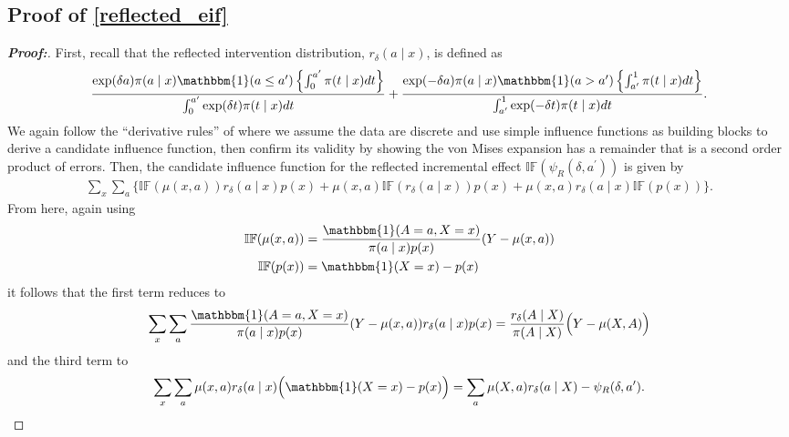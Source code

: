 \documentclass[11pt,twoside]{article}
\theoremstyle{definition}
\theoremstyle{remark}
\begin{document}
\subsection{Proof of \cref{reflected_eif}} \label{reflected_eif_proof} 

\begin{proof}[\textbf{Proof:}] First, recall that the reflected intervention distribution, $r_\delta(a \mid x)$, is defined as
    \begin{align*}
     \frac{\text{exp}(\delta a) \pi(a \mid x) \mathbbm{1}(a \leq a^\prime)\left\{ \int^{a^\prime}_0 \pi(t \mid x) dt \right\} }{\int^{a^\prime}_0 \text{exp}(\delta t) \pi(t \mid x) dt} +  \frac{\text{exp}(-\delta a) \pi(a \mid x) \mathbbm{1}(a > a^\prime) \left\{ \int^{1}_{a^\prime} \pi(t \mid x) dt \right\}}{\int^{1}_{a^\prime} \text{exp}(-\delta t) \pi(t \mid x) dt}.
\end{align*}
We again follow the ``derivative rules'' of \cite{kennedy2023semiparametric} where we assume the data are discrete and use simple influence functions as building blocks to derive a candidate influence function, then confirm its validity by showing the von Mises expansion has a remainder that is a second order product of errors. Then, the candidate influence function for the reflected incremental effect $\mathbb{IF}(\psi_R(\delta, a^\prime))$ is given by
\begin{align*}
     \sum_x \sum_a \Big\{\mathbb{IF}( \mu(x, a) ) r_\delta(a \mid x)  p(x) + \mu(x, a) \mathbb{IF}( r_\delta(a \mid x))  p(x) +  \mu(x, a) r_\delta(a \mid x) \mathbb{IF}( p(x)) \Big\}.
\end{align*}
From here, again using
\begin{align*}
    \mathbb{IF}(\mu(x, a)) &= \frac{\mathbbm{1}(A = a, X = x)}{\pi(a \mid x) p(x)}(Y - \mu(x, a)) \\
    \mathbb{IF}(p(x)) &= \mathbbm{1}(X = x) - p(x)
\end{align*}
it follows that the first term reduces to
\begin{align*}
     \sum_x \sum_a \frac{\mathbbm{1}(A = a, X = x)}{\pi(a \mid x) p(x)}(Y - \mu(x, a)) r_\delta(a \mid x)  p(x) = \frac{r_\delta(A \mid X)}{\pi(A \mid X)} \Big(Y - \mu(X, A) \Big)
\end{align*}
and the third term to
\begin{align*}
   \sum_x \sum_a  \mu(x, a) r_\delta(a \mid x) \Big( \mathbbm{1}(X = x) - p(x) \Big) = \sum_a  \mu(X, a) r_\delta(a \mid X) - \psi_R(\delta, a^\prime).
\end{align*}

\end{proof}
\end{document}
